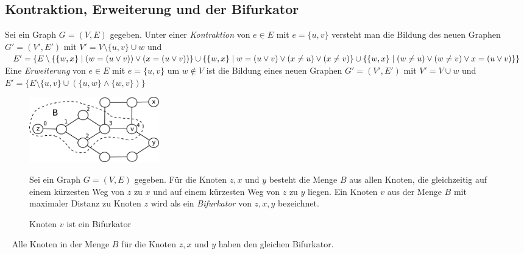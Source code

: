 \subsection{Kontraktion, Erweiterung und der Bifurkator}
Sei ein Graph $G=(V,E)$ gegeben. Unter einer \emph{Kontraktion} von $e \in E$ mit $e=\{u,v\}$ versteht man die Bildung des neuen Graphen $G'=(V',E')$ mit $V'=V \setminus{\{u,v\}} \cup w$ und $E'=\{E\setminus\{\{w,x\}\;|\;(w=(u \vee v)) \vee (x=(u\vee v))\} \cup\\ \{\{w,x\}\;|\;w=(u \vee v) \vee (x\neq u)\vee(x \neq v)\} \cup \{\{w,x\}\;|\;(w\neq u) \vee (w \neq v) \vee x=(u\vee v)\} \}$\newline\newline
Eine \emph{Erweiterung} von $e \in E$ mit $e=\{u,v\}$ um $w \notin V$ ist die Bildung eines neuen Graphen $G'=(V',E')$ mit $V'=V \cup w$ und $E'=\{E \setminus \{u,v\} \cup (\{u,w\} \wedge \{w,v\})\}$\newline
\vspace{-4mm}
\begin{figure}[ht]
\begin{minipage}{210pt}
\centering
\includegraphics*[width = 160pt]{bilder/bifurkator.pdf}
\caption{Knoten $v$ ist ein Bifurkator}
\label{bild:bifurkator}
\end{minipage}
\begin{minipage}{210pt}
Sei ein Graph $G=(V,E)$ gegeben. Für die Knoten $z,x$ und $y$ besteht die Menge $B$ aus allen Knoten, die gleichzeitig auf einem kürzesten Weg von $z$ zu $x$ und auf einem kürzesten Weg von $z$ zu $y$ liegen. Ein Knoten $v$ aus der Menge $B$ mit maximaler Distanz zu Knoten $z$ wird als ein \emph{Bifurkator} von $z, x, y$ bezeichnet.
\end{minipage}
\end{figure}
\vspace{-2mm}  	
~\linebreak
Alle Knoten in der Menge $B$ für die Knoten $z,x$ und $y$ haben den gleichen Bifurkator.
\vspace{-3mm}
